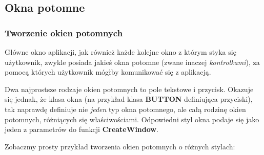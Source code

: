 ﻿\subsection{Okna potomne}

\subsubsection{Tworzenie okien potomnych}

Główne okno aplikacji, jak również każde kolejne okno z którym styka się użytkownik,
zwykle posiada jakieś okna potomne (zwane inaczej {\em kontrolkami}), za pomocą których
użytkownik mógłby komunikować się z aplikacją.

Dwa najprostsze rodzaje okien potomnych to pole tekstowe i przycisk. Okazuje się jednak, że 
klasa okna (na przykład klasa {\bf BUTTON} definiująca przyciski), tak naprawdę definiuje nie {\em jeden} typ
okna potomnego, ale całą rodzinę okien potomnych, różniących się właściwościami. Odpowiedni styl
okna podaje się jako jeden z parametrów do funkcji {\bf CreateWindow}.

Zobaczmy prosty przykład tworzenia okien potomnych o różnych stylach:

